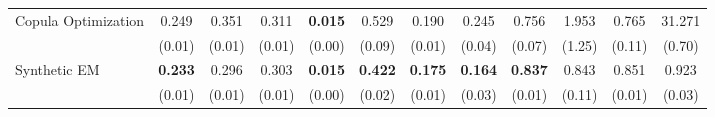 \begin{table}[ht]
{\begin{tabular}{l cccc cccc cc c}
            \addlinespace[0.2em]
            Copula Optimization     & 0.249                                           & 0.351                                        & 0.311                                         & \textbf{0.015   }       & 0.529            & 0.190           & 0.245             & 0.756           & 1.953           & 0.765           & 31.271            \\
                                    & (0.01)                                          & (0.01)                                       & (0.01)                                        & (0.00)                  & (0.09)           & (0.01)          & (0.04)            & (0.07)          & (1.25)          & (0.11)          & (0.70)            \\
            \addlinespace[0.2em]
            Synthetic EM            & \textbf{0.233        }                          & 0.296                                        & 0.303                                         & \textbf{0.015  }        & \textbf{0.422}   & \textbf{0.175 } & \textbf{0.164   } & \textbf{0.837 } & 0.843           & 0.851           & 0.923             \\
                                    & (0.01)                                          & (0.01)                                       & (0.01)                                        & (0.00)                  & (0.02)           & (0.01)          & (0.03)            & (0.01)          & (0.11)          & (0.01)          & (0.03)            \\


\end{tabular}}
\end{table}
